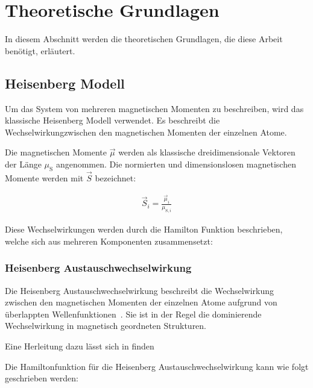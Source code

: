 \documentclass[main.tex]{subfiles}
\begin{document}
\newpage
\section{Theoretische Grundlagen}

In diesem Abschnitt werden die theoretischen Grundlagen, die diese Arbeit benötigt, erläutert.

\subsection{Heisenberg Modell}

Um das System von mehreren magnetischen Momenten zu beschreiben, wird das klassische Heisenberg Modell verwendet. Es beschreibt die Wechselwirkungzwischen den magnetischen Momenten der einzelnen Atome.

Die magnetischen Momente \(\vec{\mu}\) werden als klassische dreidimensionale Vektoren der Länge \(\mu_{\text{S}}\) angenommen.
Die normierten und dimensionslosen magnetischen Momente werden mit \(\vec{S}\) bezeichnet:

\begin{align}
	\vec{S}_i = \frac{\vec{\mu}_i}{\mu_{\text{S},i}}
\end{align}


Diese Wechselwirkungen werden durch die Hamilton Funktion beschrieben, welche sich aus mehreren Komponenten zusammensetzt:

\subsubsection*{Heisenberg Austauschwechselwirkung}

Die Heisenberg Austauschwechselwirkung beschreibt die Wechselwirkung zwischen den magnetischen Momenten der einzelnen Atome aufgrund von überlappten Wellenfunktionen~\cite{Heisenberg-Ferromagnetismus}. 
Sie ist in der Regel die dominierende Wechselwirkung in magnetisch geordneten Strukturen.

Eine Herleitung dazu lässt sich in \cite{magnetism-in-condensed-matter} finden

Die Hamiltonfunktion für die Heisenberg Austauschwechselwirkung kann wie folgt geschrieben werden:
\end{document}
